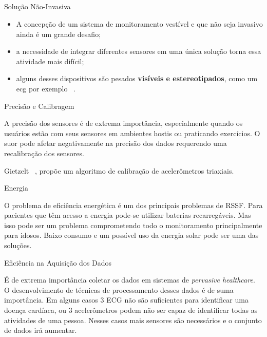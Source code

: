 \documentclass{beamer}
\begin{document}
\subsection{}
\begin{frame}{Solução Não-Invasiva}
  \begin{block}{}
    \begin{itemize}[<+->]
     \item A concepção de um sistema de monitoramento vestível e que não seja invasivo ainda é um grande desafio; 
     \item a necessidade de integrar diferentes sensores em uma única solução torna essa atividade mais difícil;
     \item alguns desses dispositivos são pesados \textbf{visíveis e estereotipados}, como um ecg por exemplo ~\cite{aarh10}.
    \end{itemize}
  \end{block}
\end{frame}

\begin{frame}{Precisão e Calibragem}
  \begin{block}{}    
    A precisão dos sensores é de extrema importância, especialmente quando os usuários estão com seus sensores em ambientes hostis ou praticando exercícios. O suor pode afetar negativamente na precisão dos dados requerendo uma recalibração dos sensores.

    Gietzelt ~\cite{giet08}, propõe um algoritmo de calibração de acelerômetros triaxiais.
  \end{block}
\end{frame}

\begin{frame}{Energia}
  \begin{block}{}    
    O problema de eficiência energética é um dos principais problemas de RSSF. Para pacientes que têm acesso a energia pode-se utilizar baterias recarregáveis. Mas isso pode ser um problema comprometendo todo o monitoramento principalmente para idosos. Baixo consumo e um possível uso da energia solar pode ser uma das soluções.
  \end{block}
\end{frame}

\begin{frame}{Eficiência na Aquisição dos Dados}
  \begin{block}{}    
   É de extrema importância coletar os dados em sistemas de \textit{pervasive healthcare}. O desenvolvimento de técnicas de processamento desses dados é de suma importância. Em alguns casos 3 ECG não são suficientes para identificar uma doença cardíaca, ou 3 acelerômetros podem não ser capaz de identificar todas as atividades de uma pessoa. Nesses casos mais sensores são necessários e o conjunto de dados irá aumentar.
  \end{block}
\end{frame}
\end{document}
